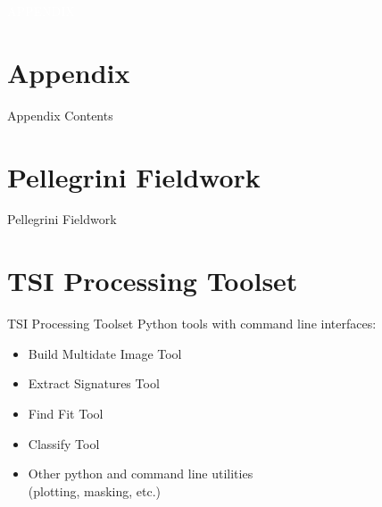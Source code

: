 \documentclass[  compress,xcolor={usenames,dvipsnames}]{beamer}
\begin{document}
\appendix

\begingroup
  \begin{frame}[plain]
    \centering
    \vfill{}\textcolor{white}{\MakeUppercase{Appendix}}
    \vfill
  \end{frame}
\endgroup
  
\section*{Appendix}

\begin{frame}{Appendix Contents}
  \tableofcontents
\end{frame}

\section{Pellegrini Fieldwork}
\begin{frame}{Pellegrini Fieldwork}
\end{frame}

\section{TSI Processing Toolset}
\begin{frame}{TSI Processing Toolset}
Python tools with command line interfaces:
\begin{itemize}
  \item Build Multidate Image Tool
  \item Extract Signatures Tool
  \item Find Fit Tool
  \item Classify Tool
  \item Other python and command line utilities\\(plotting, masking, etc.)
\end{itemize}
\end{frame}
 
\end{document}
